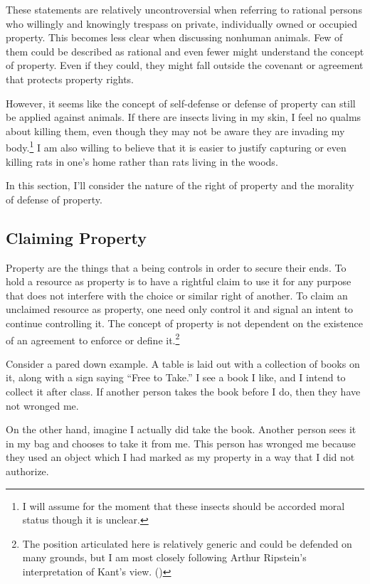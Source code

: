 	These statements are relatively uncontroversial when referring to rational
	persons who willingly and knowingly trespass on private, individually owned
	or occupied property. This becomes less clear when discussing nonhuman
	animals. Few of them could be described as rational and even fewer might
	understand the concept of property. Even if they could, they might fall
	outside the covenant or agreement that protects property rights.

	However, it seems like the concept of self-defense or defense of
	property can still be applied against animals.  If there are insects living
	in my skin, I feel no qualms about killing them, even though they may not
	be aware they are invading my body.\footnote{I will assume for the moment
	that these insects should be accorded moral status though it is unclear.}
	I am also willing to believe that it is easier to justify capturing or even
	killing rats in one’s home rather than rats living in the woods.

	In this section, I’ll consider the nature of the right of property and the
	morality of defense of property. 

	\subsection{Claiming Property}

	Property are the things that a being controls in order to secure their
	ends.  To hold a resource as property is to have a rightful claim to use it
	for any purpose that does not interfere with the choice or similar right of
	another.  To claim an unclaimed resource as property, one need only control
	it and signal an intent to continue controlling it.  The concept of
	property is not dependent on the existence of an agreement to enforce or
	define it.\footnote{The position articulated here is relatively generic and
	could be defended on many grounds, but I am most closely following Arthur
Ripstein’s interpretation of Kant’s view. (\cite{ripstein_force_freedom})}

	Consider a pared down example. A table is laid out with a collection of
	books on it, along with a sign saying “Free to Take.” I see a book I like,
	and I intend to collect it after class. If another person takes the book
	before I do, then they have not wronged me.

	On the other hand, imagine I actually did take the book. Another person
	sees it in my bag and chooses to take it from me. This person has wronged
	me because they used an object which I had marked as my property in a way
	that I did not authorize.


